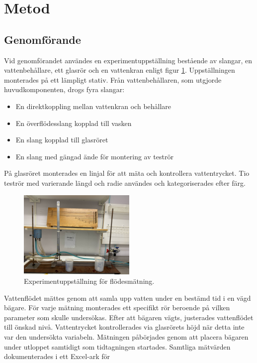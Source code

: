 \documentclass[a4paper,12pt]{article}
\begin{document}
\section{Metod}
\subsection{Genomförande}
\noindent
Vid genomförandet användes en experimentuppställning bestående av slangar, 
en vattenbehållare, ett glasrör och en vattenkran enligt figur \ref{fig:experiment_setup}. 
Uppställningen monterades på ett lämpligt stativ. Från vattenbehållaren, som utgjorde 
huvudkomponenten, drogs fyra slangar:
%
\begin{itemize}
    \item En direktkoppling mellan vattenkran och behållare
    \item En överflödesslang kopplad till vasken
    \item En slang kopplad till glasröret
    \item En slang med gängad ände för montering av teströr
\end{itemize}
%
På glasröret monterades en linjal för att mäta och kontrollera vattentrycket. 
Tio teströr med varierande längd och radie användes och kategoriserades efter färg.
%
\begin{figure}[ht]
    \centering
    \includegraphics[width=0.5\textwidth]{Labb-yta.jpg}
    \caption{Experimentuppställning för flödesmätning.}
    \label{fig:experiment_setup}
\end{figure}
%
\noindent
Vattenflödet mättes genom att samla upp vatten under en bestämd tid i en vägd bägare. 
För varje mätning monterades ett specifikt rör beroende på vilken parameter som skulle 
undersökas. Efter att bägaren vägts, justerades vattenflödet till önskad nivå. 
Vattentrycket kontrollerades via glasrörets höjd när detta inte var den undersökta 
variabeln.
%
Mätningen påbörjades genom att placera bägaren under utloppet samtidigt som 
tidtagningen startades. Samtliga mätvärden dokumenterades i ett Excel-ark för 
\end{document}
